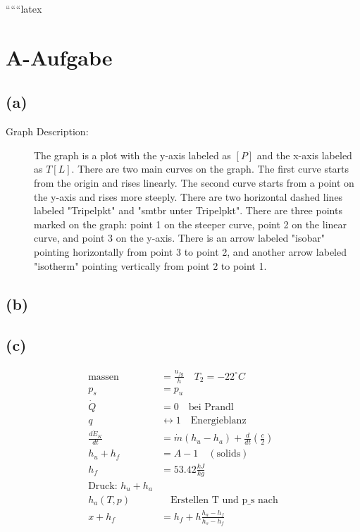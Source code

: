
``````latex


\section*{A-Aufgabe}

\subsection*{(a)}

\begin{description}
    \item[Graph Description:] The graph is a plot with the y-axis labeled as $[P]$ and the x-axis labeled as $T [L]$. There are two main curves on the graph. The first curve starts from the origin and rises linearly. The second curve starts from a point on the y-axis and rises more steeply. There are two horizontal dashed lines labeled "Tripelpkt" and "smtbr unter Tripelpkt". There are three points marked on the graph: point 1 on the steeper curve, point 2 on the linear curve, and point 3 on the y-axis. There is an arrow labeled "isobar" pointing horizontally from point 3 to point 2, and another arrow labeled "isotherm" pointing vertically from point 2 to point 1.
\end{description}

\subsection*{(b)}

\subsection*{(c)}

\begin{align*}
    \text{massen} &= \frac{u_{fg}}{h} \quad T_2 = -22^\circ C \\
    p_s &= p_u \\
    \dot{Q} &= 0 \quad \text{bei Prandl} \\
    q &\leftrightarrow 1 \quad \text{Energieblanz} \\
    \frac{d\dot{E}_K}{dt} &= \dot{m} (h_u - h_a) + \frac{d}{dt} \left( \frac{c}{2} \right) \\
    h_u + h_f &= A - 1 \quad (\text{solids}) \\
    h_f &= 53.42 \frac{kJ}{kg} \\
    \text{Druck: } h_u + h_a \\
    h_a (T, p) &\quad \text{Erstellen T und p_s nach} \\
    x + h_f &= h_f + h \frac{h_a - h_f}{h_s - h_f}
\end{align*}

